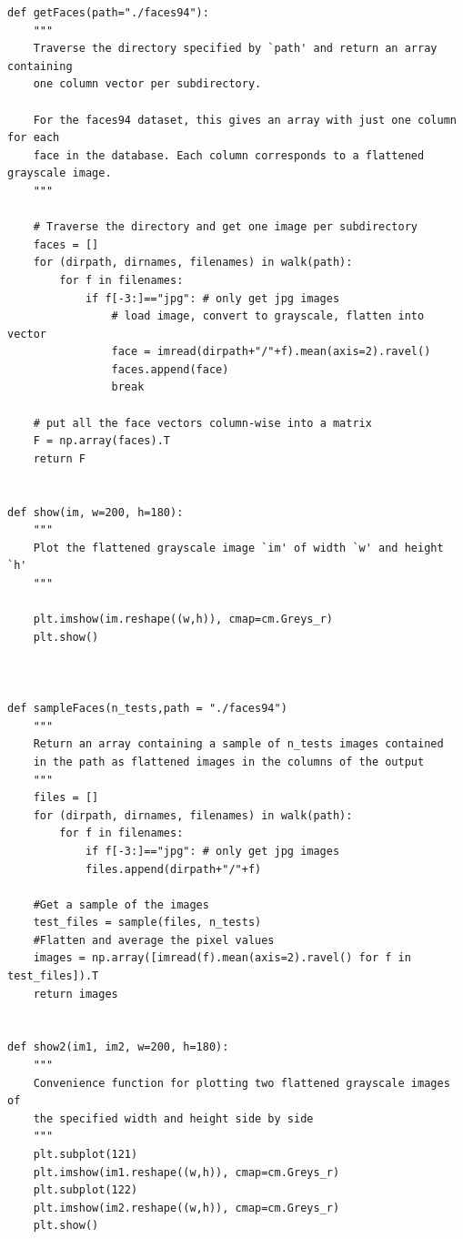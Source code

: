 \begin{lstlisting}
def getFaces(path="./faces94"):
    """
    Traverse the directory specified by `path' and return an array containing
    one column vector per subdirectory.
    
    For the faces94 dataset, this gives an array with just one column for each
    face in the database. Each column corresponds to a flattened grayscale image.
    """
    
    # Traverse the directory and get one image per subdirectory
    faces = []
    for (dirpath, dirnames, filenames) in walk(path):
        for f in filenames:
            if f[-3:]=="jpg": # only get jpg images
                # load image, convert to grayscale, flatten into vector
                face = imread(dirpath+"/"+f).mean(axis=2).ravel() 
                faces.append(face)
                break
        
    # put all the face vectors column-wise into a matrix
    F = np.array(faces).T
    return F


def show(im, w=200, h=180):
    """
    Plot the flattened grayscale image `im' of width `w' and height `h'
    """
    
    plt.imshow(im.reshape((w,h)), cmap=cm.Greys_r)
    plt.show()
    


def sampleFaces(n_tests,path = "./faces94")
    """
    Return an array containing a sample of n_tests images contained 
    in the path as flattened images in the columns of the output
    """
    files = []
    for (dirpath, dirnames, filenames) in walk(path):
        for f in filenames:
            if f[-3:]=="jpg": # only get jpg images
            files.append(dirpath+"/"+f)
            
    #Get a sample of the images
    test_files = sample(files, n_tests)
    #Flatten and average the pixel values
    images = np.array([imread(f).mean(axis=2).ravel() for f in test_files]).T
    return images
    

def show2(im1, im2, w=200, h=180):
    """
    Convenience function for plotting two flattened grayscale images of
    the specified width and height side by side
    """
    plt.subplot(121)
    plt.imshow(im1.reshape((w,h)), cmap=cm.Greys_r)
    plt.subplot(122)
    plt.imshow(im2.reshape((w,h)), cmap=cm.Greys_r)
    plt.show()


\end{lstlisting}